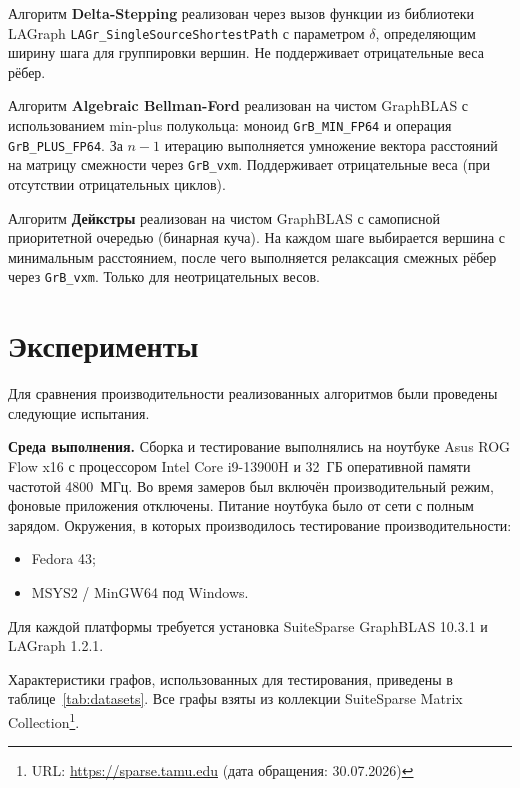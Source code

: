 \documentclass[a4paper]{article}
\begin{document}
Алгоритм \textbf{Delta-Stepping} реализован через вызов функции из библиотеки LAGraph
\texttt{LAGr\_SingleSourceShortestPath} с параметром $\delta$, определяющим ширину
шага для группировки вершин. Не поддерживает отрицательные веса рёбер.

Алгоритм \textbf{Algebraic Bellman-Ford} реализован на чистом GraphBLAS с
использованием min-plus полукольца: моноид \texttt{GrB\_MIN\_FP64} и операция
\texttt{GrB\_PLUS\_FP64}. За $n-1$ итерацию выполняется умножение вектора расстояний
на матрицу смежности через \texttt{GrB\_vxm}. Поддерживает отрицательные веса
(при отсутствии отрицательных циклов).

Алгоритм \textbf{Дейкстры} реализован на чистом GraphBLAS с самописной приоритетной
очередью (бинарная куча). На каждом шаге выбирается вершина с минимальным расстоянием,
после чего выполняется релаксация смежных рёбер через \texttt{GrB\_vxm}.
Только для неотрицательных весов.

\section{Эксперименты}

Для сравнения производительности реализованных алгоритмов были проведены следующие испытания.

\textbf{Среда выполнения.} 
Сборка и тестирование выполнялись на ноутбуке Asus ROG Flow x16 с процессором Intel Core i9-13900H и 32~ГБ оперативной памяти частотой 4800~МГц. 
Во время замеров был включён производительный режим, фоновые приложения отключены. Питание ноутбука было от сети с полным зарядом.
Окружения, в которых производилось тестирование производительности:
\begin{itemize}
    \item Fedora 43;
    \item MSYS2 / MinGW64 под Windows.
\end{itemize}


Для каждой платформы требуется установка SuiteSparse GraphBLAS 10.3.1 и LAGraph 1.2.1.

Характеристики графов, использованных для тестирования, приведены в
таблице~\ref{tab:datasets}. Все графы взяты из коллекции SuiteSparse Matrix
Collection\footnote{URL: \url{https://sparse.tamu.edu} (дата обращения: 30.07.2026)}.
\end{document}
